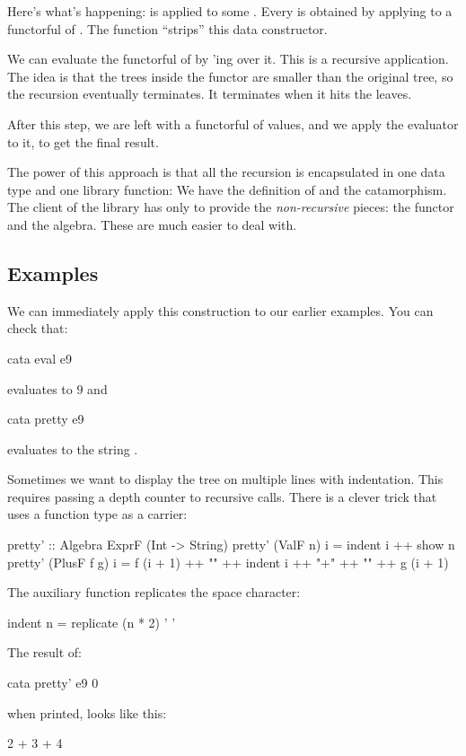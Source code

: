 \documentclass[DaoFP]{subfiles}
\begin{document}
Here's what's happening:  is applied to some . Every  is obtained by applying  to a functorful of . The function  ``strips'' this data constructor. 

We can evaluate the functorful of  by 'ing  over it. This is a recursive application. The idea is that the trees inside the functor are smaller than the original tree, so the recursion eventually terminates. It terminates when it hits the leaves. 

After this step, we are left with a functorful of values, and we apply the evaluator  to it, to get the final result.

The power of this approach is that all the recursion is encapsulated in one data type and one library function: We have the definition of  and the catamorphism. The client of the library has only to provide the \emph{non-recursive} pieces: the functor and the algebra. These are much easier to deal with.

\subsection{Examples}

We can immediately apply this construction to our earlier examples. You can check that:
\begin{haskell}
cata eval e9
\end{haskell}
evaluates to $9$ and
\begin{haskell}
cata pretty e9
\end{haskell}
evaluates to the string .

Sometimes we want to display the tree on multiple lines with indentation. This requires passing a depth counter to recursive calls. There is a clever trick that uses a function type as a carrier:
\begin{haskell}
pretty' :: Algebra ExprF (Int -> String)
pretty' (ValF n) i = indent i ++ show n
pretty' (PlusF f g) i = f (i + 1) ++ "\n" ++
                        indent i ++ "+" ++ "\n" ++
                        g (i + 1)
\end{haskell}
The auxiliary function  replicates the space character:
\begin{haskell}
indent n = replicate (n * 2) ' '
\end{haskell}
The result of:
\begin{haskell}
cata pretty' e9 0
\end{haskell}
when printed, looks like this:
\begin{haskell}
    2
  +
    3
+
  4
\end{haskell}
\end{document}
